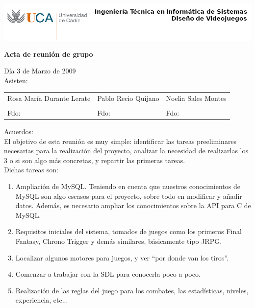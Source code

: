 \documentclass[a4paper,10pt]{article}
\begin{document}
\includegraphics[scale=0.6]{../uca.png}

\begin{center}
  \noindent \huge\textbf{ Acta de reunión de grupo}\\
\end{center}

\noindent Día 3 de Marzo de 2009\\

\noindent Asisten:

\begin{center}
\begin{tabular}{|m{5.2cm}|m{5.2cm}|m{5.2cm}|}
  \hline
  Rosa María Durante Lerate & Pablo Recio Quijano & Noelia Sales Montes\\
  & & \\[2cm]
  Fdo: & Fdo: & Fdo: \\
  \hline
\end{tabular}
\end{center}

\noindent Acuerdos:\\

\noindent El objetivo de esta reunión es muy simple: identificar las
tareas preeliminares necesarias para la realización del proyecto,
analizar la necesidad de realizarlas los 3 o si son algo más concretas,
y repartir las primeras tareas.\\

\noindent Dichas tareas son:

\begin{enumerate}
\item Ampliación de MySQL. Teniendo en cuenta que nuestros
  conocimientos de MySQL son algo escasos para el proyecto, sobre todo
  en modificar y añadir datos. Además, es necesario ampliar los
  conocimientos sobre la API para C de MySQL.
\item Requisitos iniciales del sistema, tomados de juegos como los
  primeros Final Fantasy, Chrono Trigger y demás similares,
  básicamente tipo JRPG.
\item Localizar algunos motores para juegos, y ver ``por donde van los
  tiros''.
\item Comenzar a trabajar con la SDL para conocerla poco a poco.
\item Realización de las reglas del juego para los combates, las
  estadísticas, niveles, experiencia, etc...
\end{enumerate}
\end{document}
